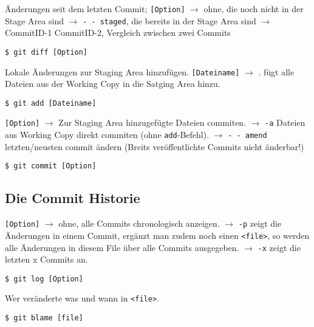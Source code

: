 \documentclass[a4paper,8pt,landscape,twocolumn]{scrartcl}
\begin{document}
\begin{orangeBox}
Änderungen seit dem letzten Commit; \texttt{[Option]} $\rightarrow$ ohne, die noch nicht in der Stage Area sind $\rightarrow$ \texttt{- - staged}, die bereits in der Stage Area sind $\rightarrow$ CommitID-1 CommitID-2, Vergleich zwischen zwei Commits
\begin{lstlisting}[style=bash]
$ git diff [Option]
\end{lstlisting}
\end{orangeBox}

\begin{orangeBox}
Lokale Änderungen zur Staging Area hinzufügen. \texttt{[Dateiname]} $\rightarrow$ . fügt alle Dateien aus der Working Copy in die Satging Area hinzu.
\begin{lstlisting}[style=bash]
$ git add [Dateiname]
\end{lstlisting}
\end{orangeBox}

\begin{orangeBox}
\texttt{[Option]} $\rightarrow$ Zur Staging Area hinzugefügte Dateien commiten. $\rightarrow$ \texttt{-a} Dateien aus Working Copy direkt commiten (ohne \texttt{add}-Befehl). $\rightarrow$ \texttt{- - amend} letzten/neusten commit ändern (Breits veröffentlichte Commits nicht änderbar!)
\begin{lstlisting}[style=bash]
$ git commit [Option]
\end{lstlisting}
\end{orangeBox}


\subsection{Die Commit Historie}
\begin{orangeBox}
\texttt{[Option]} $\rightarrow$ ohne, alle Commits chronologisch anzeigen. $\rightarrow$ \texttt{-p} zeigt die Änderungen in einem Commit, ergänzt man zudem noch einen \texttt{<file>}, so werden alle Änderungen in diesem File über alle Commits ausgegeben. $\rightarrow$ \texttt{-x} zeigt die letzten x Commits an.
\begin{lstlisting}[style=bash]
$ git log [Option]
\end{lstlisting}
\end{orangeBox}

\begin{orangeBox}
Wer veränderte was und wann in \texttt{<file>}.
\begin{lstlisting}[style=bash]
$ git blame [file]
\end{lstlisting}
\end{orangeBox}
\end{document}
